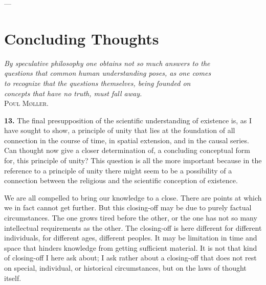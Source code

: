 \documentclass[12pt,a4paper]{book}
\newcommand{\opage}[1]{\marginnote{\footnotesize\textit{[#1]}}}
\begin{document}
\begin{center}---\end{center}

\section{Concluding Thoughts}
\label{sec:concluding}

\begin{flushright}
\opage{34}
\textit{By speculative philosophy one obtains not so much answers to the}\\
\textit{questions that common human understanding poses, as one comes}\\
\textit{to recognize that the questions themselves, being founded on}\\
\textit{concepts that have no truth, must fall away.}\\[2pt]
\textsc{Poul Møller}.
\end{flushright}

\bigskip

\noindent\textbf{13.} The final presupposition of the scientific
understanding of existence is, as I have sought to show, a principle of unity
that lies at the foundation of all connection in the course of time, in
spatial extension, and in the causal series. Can thought now give a closer
determination of, a concluding conceptual form for, this principle of unity?
This question is all the more important because in the reference to a
principle of unity there might seem to be a possibility of a connection
between the religious and the scientific conception of existence.

We are all compelled to bring our knowledge to a close. There are points at
which we in fact cannot get further. But this closing-off may be due to purely
factual circumstances. The one grows tired before the other, or the one has
not so many intellectual requirements as the other. The closing-off is here
different for different individuals, for different ages, different peoples. It
may be limitation in time and space that hinders knowledge from getting
sufficient material. It is not that kind of closing-off I here ask about; I
ask rather about a closing-off that does not rest on special, individual, or
historical circumstances, but on the laws of thought itself.
\end{document}
